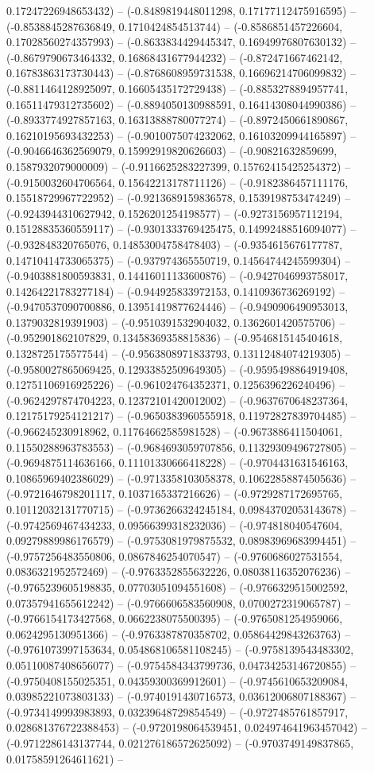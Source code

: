 0.17247226948653432) -- (-0.8489819448011298, 0.17177112475916595) -- (-0.8538845287636849, 0.1710424854513744) -- (-0.8586851457226604, 0.17028560274357993) -- (-0.8633834429445347, 0.16949976807630132) -- (-0.8679790673464332, 0.16868431677944232) -- (-0.872471667462142, 0.16783863173730443) -- (-0.8768608959731538, 0.16696214706099832) -- (-0.8811464128925097, 0.16605435172729438) -- (-0.8853278894957741, 0.16511479312735602) -- (-0.8894050130988591, 0.16414308044990386) -- (-0.8933774927857163, 0.16313888780077274) -- (-0.8972450661890867, 0.16210195693432253) -- (-0.9010075074232062, 0.16103209944165897) -- (-0.9046646362569079, 0.15992919820626603) -- (-0.90821632859699, 0.1587932079000009) -- (-0.9116625283227399, 0.15762415425254372) -- (-0.9150032604706564, 0.15642213178711126) -- (-0.9182386457111176, 0.15518729967722952) -- (-0.9213689159836578, 0.1539198753474249) -- (-0.9243944310627942, 0.1526201254198577) -- (-0.9273156957112194, 0.15128835360559117) -- (-0.9301333769425475, 0.14992488516094077) -- (-0.932848320765076, 0.14853004758478403) -- (-0.9354615676177787, 0.14710414733065375) -- (-0.937974365550719, 0.14564744245599304) -- (-0.9403881800593831, 0.14416011133600876) -- (-0.9427046993758017, 0.14264221783277184) -- (-0.944925833972153, 0.1410936736269192) -- (-0.9470537090700886, 0.13951419877624446) -- (-0.9490906490953013, 0.1379032819391903) -- (-0.9510391532904032, 0.1362601420575706) -- (-0.952901862107829, 0.13458369358815836) -- (-0.9546815145404618, 0.1328725175577544) -- (-0.9563808971833793, 0.13112484074219305) -- (-0.9580027865069425, 0.12933852509649305) -- (-0.9595498864919408, 0.12751106916925226) -- (-0.961024764352371, 0.1256396226240496) -- (-0.9624297874704223, 0.12372101420012002) -- (-0.9637670648237364, 0.12175179254121217) -- (-0.9650383960555918, 0.11972827839704485) -- (-0.966245230918962, 0.11764662585981528) -- (-0.9673886411504061, 0.11550288963783553) -- (-0.9684693059707856, 0.11329309496727805) -- (-0.9694875114636166, 0.11101330666418228) -- (-0.9704431631546163, 0.10865969402386029) -- (-0.9713358103058378, 0.10622858874505636) -- (-0.9721646798201117, 0.1037165337216626) -- (-0.9729287172695765, 0.10112032131770715) -- (-0.9736266324245184, 0.09843702053143678) -- (-0.9742569467434233, 0.09566399318232036) -- (-0.974818040547604, 0.09279889986176579) -- (-0.9753081979875532, 0.08983969683994451) -- (-0.9757256483550806, 0.0867846254070547) -- (-0.9760686027531554, 0.0836321952572469) -- (-0.9763352855632226, 0.08038116352076236) -- (-0.9765239605198835, 0.07703051094551608) -- (-0.9766329515002592, 0.07357941655612242) -- (-0.9766606583560908, 0.0700272319065787) -- (-0.9766154173427568, 0.0662238075500395) -- (-0.9765081254959066, 0.0624295130951366) -- (-0.9763387870358702, 0.05864429843263763) -- (-0.9761073997153634, 0.054868106581108245) -- (-0.9758139543483302, 0.05110087408656077) -- (-0.9754584343799736, 0.04734253146720855) -- (-0.9750408155025351, 0.04359300369912601) -- (-0.9745610653209084, 0.03985221073803133) -- (-0.9740191430716573, 0.03612006807188367) -- (-0.9734149993983893, 0.03239648729854549) -- (-0.9727485761857917, 0.028681376722388453) -- (-0.9720198064539451, 0.024974641963457042) -- (-0.9712286143137744, 0.021276186572625092) -- (-0.9703749149837865, 0.01758591264611621) -- 